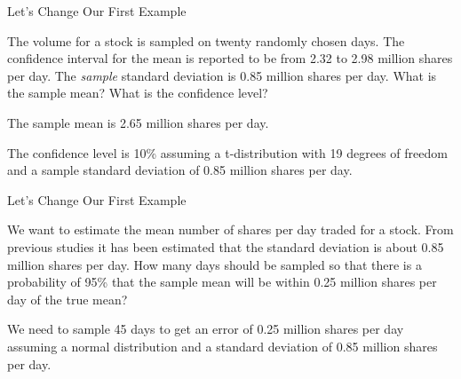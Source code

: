   

\begin{frame}{Let's Change Our First Example}

  The volume for a stock is sampled on twenty randomly chosen
  days. The confidence interval for the mean is reported to be from
  2.32 to 2.98 million shares per day. The
  {\color{red}\textit{sample}} standard deviation is 0.85 million
  shares per day. What is the sample mean?  What is the confidence
  level?

  \vfill

  {

    The sample mean is 2.65 million shares per day.

    The confidence level is 10\% assuming a t-distribution with 19
    degrees of freedom and a sample standard deviation of 0.85 million
    shares per day.

  }


\end{frame}



\begin{frame}{Let's Change Our First Example}

  We want to estimate the mean number of shares per day traded for a
  stock. From previous studies it has been estimated that the standard
  deviation is about 0.85 million shares per day. How many days should
  be sampled so that there is a probability of 95\% that the sample
  mean will be within 0.25 million shares per day of the true mean?

  \vfill

  {

    We need to sample 45 days to get an error of 0.25 million shares
    per day assuming a normal distribution and a standard deviation of
    0.85 million shares per day.

  }


\end{frame}




